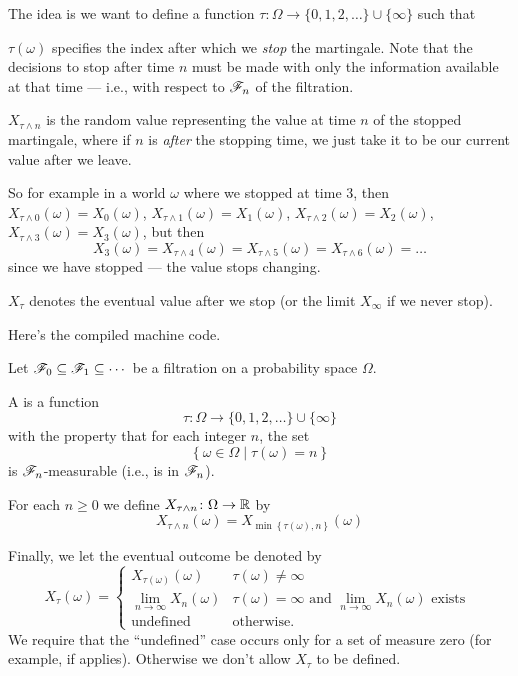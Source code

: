 The idea is we want to define a function
$\tau \colon \Omega \to \{0, 1, 2, \dots\} \cup \{\infty\}$ such that
\begin{itemize}
	\ii $\tau(\omega)$ specifies the index
	after which we \emph{stop} the martingale.
	Note that the decisions to stop after time $n$
	must be made with only the information available at that time ---
	i.e., with respect to $\mathscr F_n$ of the filtration.

	\ii $X_{\tau \wedge n}$ is the random value representing the
	value at time $n$ of the stopped martingale,
	where if $n$ is \emph{after} the stopping time,
	we just take it to be our current value after we leave.

	So for example in a world $\omega$ where we stopped at time $3$, then
	$X_{\tau \wedge 0}(\omega) = X_0(\omega)$,
	$X_{\tau \wedge 1}(\omega) = X_1(\omega)$,
	$X_{\tau \wedge 2}(\omega) = X_2(\omega)$,
	$X_{\tau \wedge 3}(\omega) = X_3(\omega)$, but then
	\[ X_3(\omega)
		= X_{\tau \wedge 4}(\omega)
		= X_{\tau \wedge 5}(\omega)
		= X_{\tau \wedge 6}(\omega)
		= \dots
	\]
	since we have stopped --- the value stops changing.

	\ii $X_{\tau}$ denotes the eventual value after we stop
	(or the limit $X_\infty$ if we never stop).
\end{itemize}

Here's the compiled machine code.
\begin{definition}
	Let $\mathscr F_0 \subseteq \mathscr F_1 \subseteq \cdots$ be a filtration
	on a probability space $\Omega$.
	\begin{itemize}
		\ii A  is a function
		\[ \tau \colon \Omega \to \{0, 1, 2, \dots\} \cup \{\infty\} \]
		with the property that for each integer $n$, the set
		\[ \left\{ \omega \in \Omega \mid \tau(\omega) = n \right\} \]
		is $\mathscr F_n$-measurable (i.e., is in $\mathscr F_n$).

		\ii For each $n \ge 0$ we define
		$X_{\tau \wedge n} \colon \Omega \to \mathbb R$ by
		\[ X_{\tau \wedge n}(\omega)
		= X_{\min \left\{ \tau(\omega), n \right\}}(\omega) \]

		\ii Finally, we let the eventual outcome be denoted by
		\[ X_\tau(\omega)
			= \begin{cases}
				X_{\tau(\omega)}(\omega) & \tau(\omega) \neq \infty \\
				\lim_{n \to \infty} X_n(\omega) & \tau(\omega) = \infty
				\text{ and } \lim_{n \to \infty} X_n(\omega) \text{ exists } \\
				\text{undefined} & \text{otherwise}.
			\end{cases}
		\]
		We require that the ``undefined'' case occurs
		only for a set of measure zero
		(for example, if  applies).
		Otherwise we don't allow $X_\tau$ to be defined.
	\end{itemize}
\end{definition}


